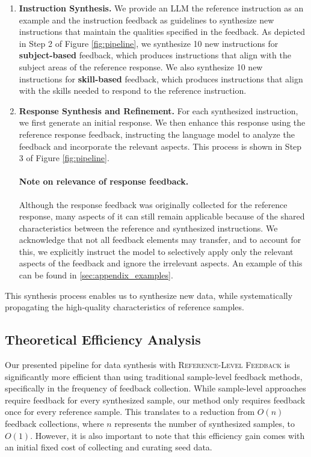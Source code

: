 \begin{enumerate}
    \item \textbf{Instruction Synthesis.} We provide an LLM the reference instruction as an example and the instruction feedback as guidelines to synthesize new instructions that maintain the qualities specified in the feedback. As depicted in Step 2 of Figure \ref{fig:pipeline}, we synthesize 10 new instructions for \textbf{subject-based} feedback, which produces instructions that align with the subject areas of the reference response. We also synthesize 10 new instructions for \textbf{skill-based} feedback, which produces instructions that align with the skills needed to respond to the reference instruction.
    
    \item \textbf{Response Synthesis and Refinement.} For each synthesized instruction, we first generate an initial response. We then enhance this response using the reference response feedback, instructing the language model to analyze the feedback and incorporate the relevant aspects. This process is shown in Step 3 of Figure \ref{fig:pipeline}.
    
    \paragraph{Note on relevance of response feedback.}
    Although the response feedback was originally collected for the reference response, many aspects of it can still remain applicable because of the shared characteristics between the reference and synthesized instructions. We acknowledge that not all feedback elements may transfer, and to account for this, we explicitly instruct the model to selectively apply only the relevant aspects of the feedback and ignore the irrelevant aspects. An example of this can be found in \ref{sec:appendix_examples}.
\end{enumerate}

This synthesis process enables us to synthesize new data, while systematically propagating the high-quality characteristics of reference samples.

\subsection{Theoretical Efficiency Analysis}
Our presented pipeline for data synthesis with \textsc{Reference-Level Feedback} is significantly more efficient than using traditional sample-level feedback methods, specifically in the frequency of feedback collection. While sample-level approaches require feedback for every synthesized sample, our method only requires feedback once for every reference sample. This translates to a reduction from $O(n)$ feedback collections, where $n$ represents the number of synthesized samples, to $O(1)$. However, it is also important to note that this efficiency gain comes with an initial fixed cost of collecting and curating seed data.
